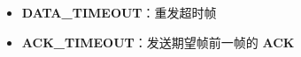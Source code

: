 \begin{enumerate}
\begin{itemize}
\begin{itemize}
                            \end{itemize}
                        \item \textbf{DATA_TIMEOUT}：重发超时帧
                        \item \textbf{ACK_TIMEOUT}：发送期望帧前一帧的 \textbf{ACK}
                    \end{itemize}
            \end{enumerate} 
            
